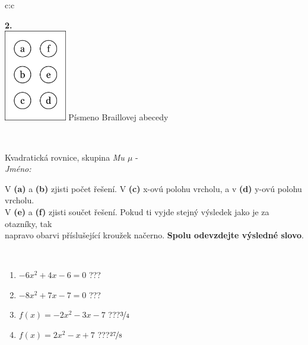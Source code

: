 \documentclass[10pt]{report}
\begin{document}
\begin{tabular}{c:c}
\begin{minipage}[c][104.5mm][t]{0.5\linewidth}
\begin{center}
\begin{minipage}{0.20\linewidth}
\begin{center}
{\Huge\bfseries 2.} \\[2mm]
\includegraphics[height=40mm]{../images/braille.png}
{\small Písmeno Braillovej abecedy}
\end{center}
\end{minipage}
\end{center}
\end{minipage}
\\ \hdashline
\begin{minipage}[c][104.5mm][t]{0.5\linewidth}
\begin{center}
\vspace{7mm}
{\huge Kvadratická rovnice, skupina \textit{Mu $\mu$} -}\\[5mm]
\textit{Jméno:}\phantom{xxxxxxxxxxxxxxxxxxxxxxxxxxxxxxxxxxxxxxxxxxxxxxxxxxxxxxxxxxxxxxxxx}\\[5mm]
\begin{minipage}{0.95\linewidth}
\begin{center}
V \textbf{(a)} a \textbf{(b)} zjisti počet řešení. V \textbf{(c)} x-ovú polohu vrcholu, a v \textbf{(d)} y-ovú polohu vrcholu.\\V \textbf{(e)} a \textbf{(f)} zjisti součet řešení. Pokud ti vyjde stejný výsledek jako je za otazníky, tak\\napravo obarvi příslušející kroužek načerno. \textbf{Spolu odevzdejte výsledné slovo}.
\end{center}
\end{minipage}
\\[1mm]
\begin{minipage}{0.79\linewidth}
\begin{center}
\begin{varwidth}{\linewidth}
\begin{enumerate}
\Large
\item $-6x^2+4x-6=0$\quad \dotfill\; ???\;\dotfill {}
\item $-8x^2+7x-7=0$\quad \dotfill\; ???\;\dotfill {}
\item $f(x)=-2x^2-3x-7$\quad \dotfill\; ???\;\dotfill \quad $\nicefrac{3}{4}$
\item $f(x)=2x^2-x+7$\quad \dotfill\; ???\;\dotfill \quad $\nicefrac{27}{8}$

\end{enumerate}
\end{varwidth}
\end{center}
\end{minipage}
\end{center}
\end{minipage}
\end{tabular}
\end{document}
